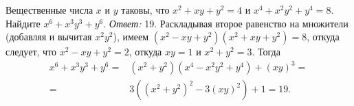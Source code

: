 \problem
Вещественные числа $x$ и $y$ таковы, что
$x^2 + x y + y^2 = 4$ и $x^4 + x^2 y^2 + y^4 = 8$.
Найдите $x^6 + x^3 y^3 + y^6$.
\solution
\emph{Ответ:} 19.
Раскладывая второе равенство на множители (добавляя и вычитая $x^2 y^2$), имеем
$(x^2 - x y + y^2) (x^2 + x y + y^2) = 8$,
откуда следует, что $x^2  - x y + y^2 = 2$,
откуда $x y = 1$ и $x^2 + y^2 = 3$.
Тогда
\begin{align*}
    x^6 + x^3 y^3 + y^6
={}&
    (x^2 + y^2) (x^4 - x^2 y^2 + y^4) + (x y)^3
=\\={}&
    3((x^2 + y^2)^2 - 3 (x y)^2) + 1 = 19
.\end{align*}
\endproblem
